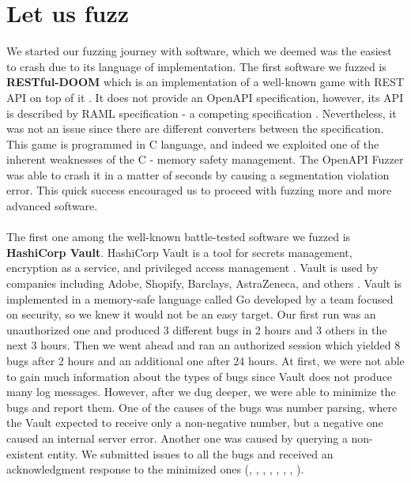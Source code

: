 \section{Let us fuzz}
We started our fuzzing journey with software, which we deemed was the easiest to crash due to its language of implementation. The first software we fuzzed is \textbf{RESTful-DOOM} which is an implementation of a well-known game with REST API on top of it \cite{doom2020github}. It does not provide an OpenAPI specification, however, its API is described by RAML specification - a competing specification \cite{raml2020web}. Nevertheless, it was not an issue since there are different converters between the specification. This game is programmed in C language, and indeed we exploited one of the inherent weaknesses of the C - memory safety management. The OpenAPI Fuzzer was able to crash it in a matter of seconds by causing a segmentation violation error. This quick success encouraged us to proceed with fuzzing more and more advanced software.

\paragraph{}
The first one among the well-known battle-tested software we fuzzed is \textbf{HashiCorp Vault}. HashiCorp Vault is a tool for secrets management, encryption as a service, and privileged access management \cite{vault2020github}. Vault is used by companies including Adobe, Shopify, Barclays, AstraZeneca, and others \cite{vault2021web}. Vault is implemented in a memory-safe language called Go developed by a team focused on security, so we knew it would not be an easy target. Our first run was an unauthorized one and produced 3 different bugs in 2 hours and 3 others in the next 3 hours. Then we went ahead and ran an authorized session which yielded 8 bugs after 2 hours and an additional one after 24 hours. At first, we were not able to gain much information about the types of bugs since Vault does not produce many log messages. However, after we dug deeper, we were able to minimize the bugs and report them. One of the causes of the bugs was number parsing, where the Vault expected to receive only a non-negative number, but a negative one caused an internal server error. Another one was caused by querying a non-existent entity. We submitted issues to all the bugs and received an acknowledgment response to the minimized ones (\cite{vaultissue11304github}, \cite{vaultissue11306github}, \cite{vaultissue11308github}, \cite{vaultissue11310github}, \cite{vaultissue11311github}, \cite{vaultissue11313github}, \cite{vaultissue11314github}, \cite{vaultissue11315github}).

